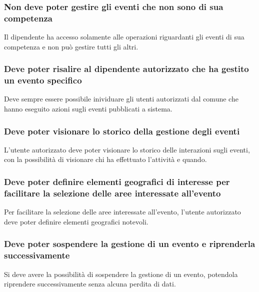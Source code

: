 \documentclass{article}
\begin{document}
\subsubsection{Non deve poter gestire gli eventi che non sono di sua competenza}
\label{5.3.3}
Il dipendente ha accesso solamente alle operazioni riguardanti gli eventi di sua competenza e non può gestire tutti gli altri.

\subsubsection{Deve poter risalire al dipendente autorizzato che ha gestito un evento specifico}
\label{5.3.4}
Deve sempre essere possibile inividuare gli utenti autorizzati dal comune che hanno eseguito azioni sugli eventi pubblicati a sistema.

\subsubsection{Deve poter visionare lo storico della gestione degli eventi}
\label{5.3.5}
L'utente autorizzato deve poter visionare lo storico delle interazioni sugli eventi, con la possibilità di visionare chi ha effettuato l'attività e quando.

\subsubsection{Deve poter definire elementi geografici di interesse per facilitare la selezione delle aree interessate all'evento}
\label{5.3.6}
Per facilitare la selezione delle aree interessate all'evento, l'utente autorizzato deve poter definire elementi geografici notevoli.

\subsubsection{Deve poter sospendere la gestione di un evento e riprenderla successivamente}
\label{5.3.7}
Si deve avere la possibilità di sospendere la gestione di un evento, potendola riprendere successivamente senza alcuna perdita di dati.
\end{document}
